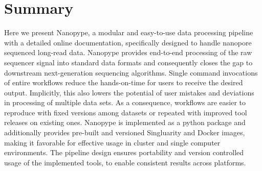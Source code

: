 



\section{Summary}
\label{sec:nanopype:summary}
Here we present Nanopype, a modular and easy-to-use data processing pipeline with a detailed online documentation, specifically designed to handle nanopore sequenced long-read data.
Nanopype provides end-to-end processing of the raw sequencer signal into standard data formats and consequently closes the gap to downstream next-generation sequencing algorithms. Single command invocations of entire workflows reduce the hands-on-time for users to receive the desired output. Implicitly, this also lowers the potential of user mistakes and deviations in processing of multiple data sets. As a consequence, workflows are easier to reproduce with fixed versions among datasets or repeated with improved tool releases on existing ones.
Nanopype is implemented as a python package and additionally provides pre-built and versioned Singluarity and Docker images, making it favorable for effective usage in cluster and single computer environments. The pipeline design ensures portability and version controlled usage of the implemented tools, to enable consistent results across platforms.


